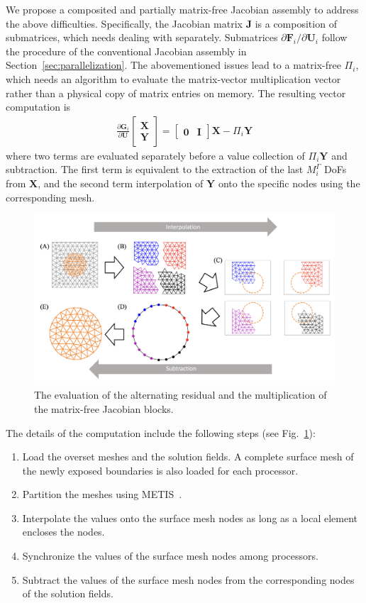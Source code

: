 \documentclass[preprint,12pt,sort&compress]{elsarticle}
\theoremstyle{definition}%
\begin{document}
We propose a composited and partially matrix-free Jacobian assembly to address the above difficulties.
Specifically, the Jacobian matrix $\bm{J}$ is a composition of submatrices, which needs dealing with separately.
Submatrices $\partial \bm{F}_i/\partial \bm{U}_{i}$ follow the procedure of the conventional Jacobian assembly in Section~\ref{sec:parallelization}. 
The abovementioned issues lead to a matrix-free $\Pi_i$, which needs an algorithm to evaluate the matrix-vector multiplication vector rather than a physical copy of matrix entries on memory. 
The resulting vector computation is
\begin{align}
  \frac{\partial \bm{G}_i}{\partial \bm{U}}
  \begin{bmatrix}
    \bm{X}\\
    \bm{Y}
  \end{bmatrix}
  =
  \begin{bmatrix}
    \bm{0} & \bm{I}
  \end{bmatrix}
  \bm{X} - \Pi_i\bm{Y}
\end{align}
where two terms are evaluated separately before a value collection of $\Pi_i\bm{Y}$ and subtraction.
The first term is equivalent to the extraction of the last $M^\Gamma_i$ DoFs from $\bm{X}$, and the second term interpolation of $\bm{Y}$ onto the specific nodes
using the corresponding mesh.
\begin{figure}
  \center
  \includegraphics[width=1.0\textwidth]{fig/overset-residual-evaluation.png}
  \caption{The evaluation of the alternating residual and the multiplication of the matrix-free Jacobian blocks.}
  \label{fig:overset-residual-evaluation}
\end{figure}
The details of the computation include the following steps (see Fig.~\ref{fig:overset-residual-evaluation}):
\begin{enumerate}
  \item Load the overset meshes and the solution fields. A complete surface mesh of the newly exposed boundaries is also loaded for each processor.
  \item Partition the meshes using METIS~\cite{karypis1998fast}.
  \item Interpolate the values onto the surface mesh nodes as long as a local element encloses the nodes.
  \item Synchronize the values of the surface mesh nodes among processors.
  \item Subtract the values of the surface mesh nodes from the corresponding nodes of the solution fields.
\end{enumerate}
\end{document}
